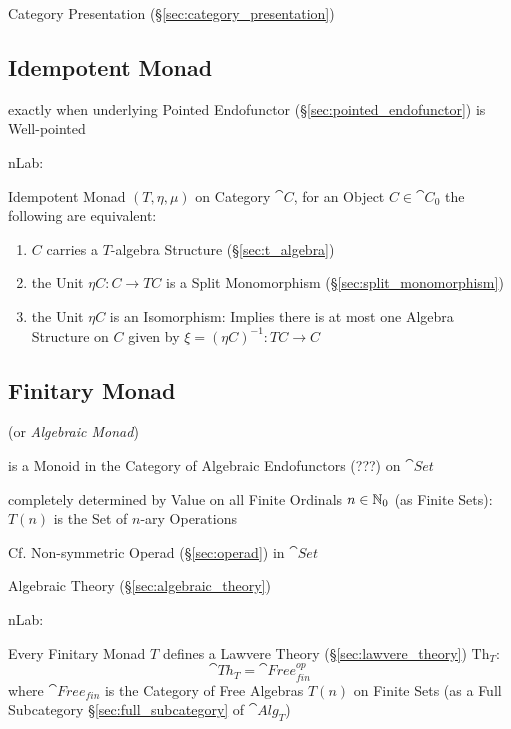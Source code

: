 Category Presentation (\S\ref{sec:category_presentation})



\subsection{Idempotent Monad}\label{sec:idempotent_monad}

exactly when underlying Pointed Endofunctor
(\S\ref{sec:pointed_endofunctor}) is Well-pointed

nLab:

Idempotent Monad $(T, \eta, \mu)$ on Category $\cat{C}$, for an Object
$C \in \cat{C}_0$ the following are equivalent:
\begin{enumerate}
  \item $C$ carries a $T$-algebra Structure (\S\ref{sec:t_algebra})
  \item the Unit $\eta C : C \rightarrow T C$ is a Split Monomorphism
    (\S\ref{sec:split_monomorphism})
  \item the Unit $\eta C$ is an Isomorphism: Implies there is at most
    one Algebra Structure on $C$ given by $\xi = (\eta C)^{-1} : T C
    \rightarrow C$ %
\end{enumerate}



\subsection{Finitary Monad}\label{sec:finitary_monad}

(or \emph{Algebraic Monad})

is a Monoid in the Category of Algebraic Endofunctors (???) on
$\cat{Set}$

completely determined by Value on all Finite Ordinals $n \in \mathbb{N}_0$
(as Finite Sets): $T(n)$ is the Set of $n$-ary Operations

\fist Cf. Non-symmetric Operad (\S\ref{sec:operad}) in
$\cat{Set}$


\asterism


Algebraic Theory (\S\ref{sec:algebraic_theory})

nLab:

Every Finitary Monad $T$ defines a Lawvere Theory
(\S\ref{sec:lawvere_theory}) $\mathrm{Th}_T$:
\[
  \cat{Th}_T = \cat{Free}^{op}_{fin}
\]
where $\cat{Free}_{fin}$ is the Category of Free Algebras $T(n)$ on
Finite Sets (as a Full Subcategory \S\ref{sec:full_subcategory} of
$\cat{Alg}_T$) %

